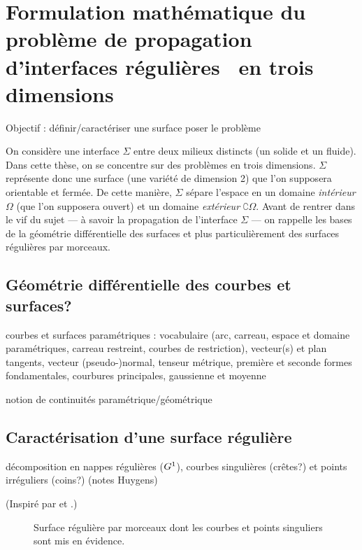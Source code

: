 \chapter[Formulation du problème de propagation d'interfaces régulières \piecewise\ en \troisD]{Formulation mathématique du problème de propagation d'interfaces régulières \piecewise\ en trois dimensions}
\label{chap:formulation_probleme_propagation}

Objectif : définir/caractériser une surface poser le problème

On considère une interface $\Sigma$ entre deux milieux distincts (\eg un solide et un fluide).
Dans cette thèse, on se concentre sur des problèmes en trois dimensions. 
$\Sigma$ représente donc une surface (\ie une variété de dimension 2) que l’on supposera orientable et fermée.
De cette manière, $\Sigma$ sépare l'espace en un domaine \textit{intérieur} $\Omega$ (que l'on supposera ouvert) et un domaine \textit{extérieur} $\complement{\Omega}$.
Avant de rentrer dans le vif du sujet --- à savoir la propagation de l'interface $\Sigma$ --- on rappelle les bases de la géométrie différentielle des surfaces et plus particulièrement des surfaces régulières par morceaux.


\section{Géométrie différentielle des courbes et surfaces?}
courbes et surfaces paramétriques : vocabulaire (arc, carreau, espace et domaine paramétriques, carreau restreint, courbes de restriction),  vecteur(s) et plan tangents, vecteur (pseudo-)normal, tenseur métrique, première et seconde formes fondamentales, courbures principales, gaussienne et moyenne
\par
notion de continuités paramétrique/géométrique

\section{Caractérisation d'une surface régulière \piecewise}
décomposition en nappes régulières ($G^{1}$), courbes singulières (crêtes?) et points irréguliers (coins?) (\cf notes Huygens)
\par\bigskip
(Inspiré par \cite[p.65]{rossignac1985} et \cite[Section 2.6]{rossignac1986}.)\par

\begin{figure}
	\centering
	
	\caption{Surface régulière par morceaux dont les courbes et points singuliers sont mis en évidence.}
	\label{fig:piecewise_smooth_surface_decomposition}
\end{figure}


